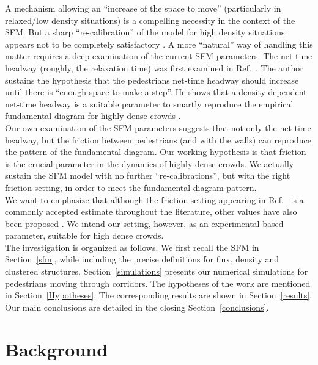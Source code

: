 \documentclass[preprint,12pt]{elsarticle}
\begin{document}
A mechanism allowing an ``increase of the space to move'' (particularly in relaxed/low
 density situations) is a compelling necessity in the context of the SFM.
But a sharp ``re-calibration'' of the model for high density situations appears not 
to be completely satisfactory \cite{johansson}. A more ``natural'' way of 
handling this matter requires a deep examination of the current SFM parameters. 
The net-time headway (roughly, the relaxation time) was first examined in 
Ref.~\cite{johansson}. The author sustains the hypothesis that the 
pedestrians net-time headway should increase until there is ``enough space to 
make a step''. He shows that a density dependent net-time headway is a 
suitable parameter to smartly reproduce the empirical fundamental diagram for 
highly dense crowds \cite{johansson}.  \\ 

Our own examination of the SFM parameters suggests that not only the net-time 
headway, but the friction between pedestrians (and with the walls) can 
reproduce the pattern of the fundamental diagram. Our working hypothesis is 
that friction is the crucial parameter in the dynamics of highly dense crowds. 
We actually sustain the SFM model with no further ``re-calibrations'', but 
with the right friction setting, in order to meet the fundamental diagram 
pattern. \\  

We want to emphasize that although the friction setting appearing in 
Ref.~\cite{Helbing1} is a commonly accepted estimate throughout the  
literature, other values have also been proposed \cite{colombi2017}. We 
intend our setting, however, as an experimental based parameter, suitable for 
high dense crowds. \\

The investigation is organized as follows. We first recall the SFM in 
Section~\ref{sfm}, while including the precise definitions for flux, density 
and clustered structures. Section~\ref{simulations} presents our numerical 
simulations for pedestrians moving through corridors. The hypotheses of the 
work are mentioned in Section~\ref{Hypotheses}. The corresponding results 
are shown in Section~\ref{results}. Our main conclusions are detailed in the 
closing Section~\ref{conclusions}.\\     

\section{\label{background}Background}
\end{document}

